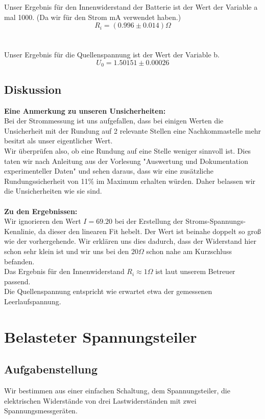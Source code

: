 \documentclass{article}
\begin{document}
\newpage
Unser Ergebnis für den Innenwiderstand der Batterie ist der Wert der Variable a mal 1000. (Da wir für den Strom mA verwendet haben.)\\
$$\boxed{R_i=(0.996 \pm 0.014)\Omega}$$\\
\\
Unser Ergebnis für die Quellenspannung ist der Wert der Variable b. \\
$$\boxed{U_0=1.50151 \pm 0.00026}$$


\subsection{Diskussion}
\textbf{Eine Anmerkung zu unseren Unsicherheiten:}\\
Bei der Strommessung ist uns aufgefallen, dass bei einigen Werten die Unsicherheit mit der Rundung auf 2 relevante Stellen eine Nachkommastelle mehr besitzt als unser eigentlicher Wert.\\
Wir überprüfen also, ob eine Rundung auf eine Stelle weniger sinnvoll ist. Dies taten wir nach Anleitung aus der Vorlesung "Auswertung und Dokumentation experimenteller Daten" und sehen daraus, dass wir eine zusätzliche Rundungssicherheit von 11\% im Maximum erhalten würden. Daher belassen wir die Unsicherheiten wie sie sind.\\
\\
\textbf{Zu den Ergebnissen:}\\
Wir ignorieren den Wert $I=69.20$ bei der Erstellung der Stroms-Spannungs-Kennlinie, da dieser den linearen Fit hebelt. Der Wert ist beinahe doppelt so groß wie der vorhergehende. Wir erklären uns dies dadurch, dass der Widerstand hier schon sehr klein ist und wir uns bei den $20\Omega$ schon nahe am Kurzschluss befanden.
\\
Das Ergebnis für den Innenwiderstand $R_i\approx 1\Omega$ ist laut unserem Betreuer passend.\\
Die Quellenspannung entspricht wie erwartet etwa der gemessenen Leerlaufspannung.

\newpage

\section{Belasteter Spannungsteiler}

\subsection{Aufgabenstellung}
Wir bestimmen aus einer einfachen Schaltung, dem Spannungsteiler, die elektrischen Widerstände von drei Lastwiderständen mit zwei Spannungsmessgeräten.
\end{document}
